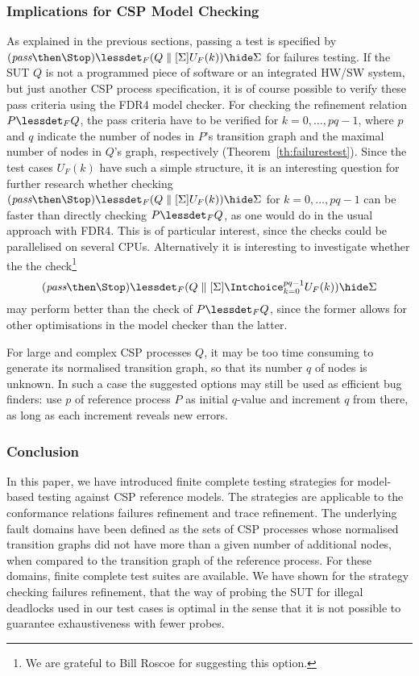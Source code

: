\subsubsection*{Implications for CSP Model Checking}
As explained in the previous sections, passing a test is specified by
$(\epass\then\Stop) \lessdet_F (Q\parallel[\Sigma] U_F(k)) \hide \Sigma$
for failures testing. If the SUT $Q$ is not a programmed piece of software or
an integrated HW/SW system, but just another CSP process specification,
it is of course possible to verify these pass criteria using the FDR4 model checker.
For checking the refinement relation $P\lessdet_F Q$, the pass criteria have to be verified
for $k=0,\dots,pq-1$, where $p$ and $q$ indicate the number of nodes in $P$'s transition
graph and the maximal number of nodes in $Q$'s graph, respectively (Theorem~\ref{th:failurestest}). Since the test cases
$U_F(k)$ have such a simple structure, it is an interesting question for further
research whether checking
$(\epass\then\Stop) \lessdet_F (Q\parallel[\Sigma] U_F(k)) \hide \Sigma$ for $k=0,\dots,pq-1$ can be faster than directly
checking $P\lessdet_F Q$, as one would do in the usual
approach with FDR4. This is of particular interest, since the checks could be parallelised
on several CPUs. Alternatively it is interesting to investigate whether the
the check\footnote{We are grateful to Bill Roscoe for suggesting this option.}
\[
(\epass\then\Stop) \lessdet_F (Q\parallel[\Sigma] \Intchoice_{k=0}^{pq-1} U_F(k)) \hide \Sigma
\]
may perform better than the check of $P\lessdet_F Q$, since the former allows for
other optimisations in the model checker than the latter.

For large and complex CSP processes $Q$, it may be too time consuming to generate
its normalised transition graph, so that its number $q$ of nodes is unknown.
In such a case the suggested options may still be used
as efficient bug finders: use  $p$ of reference process $P$ as initial $q$-value
and
increment $q$ from there, as long as each increment reveals new errors.





\subsubsection*{Conclusion}

In this paper, we have introduced finite complete testing strategies for
model-based testing against CSP reference models. The strategies are applicable
to the conformance relations failures refinement and trace refinement. The underlying fault domains have been defined as the sets of CSP processes whose normalised transition
graphs did not have more than a given number of additional nodes, when compared to the transition graph of the reference process. For these domains, finite complete
test suites are available. We have shown for the strategy checking failures refinement,
 that the way of probing the SUT for illegal deadlocks used in our test cases is
 optimal in the sense that it is not possible to guarantee exhaustiveness with fewer
 probes.

